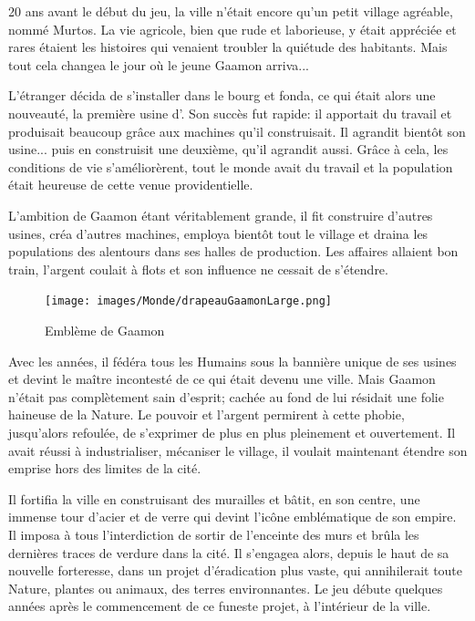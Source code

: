 20 ans avant le début du jeu, la ville n'était encore qu'un petit village agréable, nommé Murtos. La vie agricole, bien que rude et laborieuse, y était appréciée et rares étaient les histoires qui venaient troubler la quiétude des habitants. Mais tout cela changea le jour où le jeune Gaamon arriva...

L'étranger décida de s'installer dans le bourg et fonda, ce qui était alors une nouveauté, la première usine d'\nomUnivers. Son succès fut rapide: il apportait du travail et produisait beaucoup grâce aux machines qu'il construisait. Il agrandit bientôt son usine... puis en construisit une deuxième, qu'il agrandit aussi. Grâce à cela, les conditions de vie s'améliorèrent, tout le monde avait du travail et la population était heureuse de cette venue providentielle.

L'ambition de Gaamon étant véritablement grande, il fit construire d'autres usines, créa d'autres machines, employa bientôt tout le village et draina les populations des alentours dans ses halles de production. Les affaires allaient bon train, l'argent coulait à flots et son influence ne cessait de s'étendre.

\begin{figure}
	\vspace*{-.8cm}
	\center
	\texttt{[image: images/Monde/drapeauGaamonLarge.png]}
	\caption{Emblème de Gaamon}
\end{figure}

Avec les années, il fédéra tous les Humains sous la bannière unique de ses usines et devint le maître incontesté de ce qui était devenu une ville. Mais Gaamon n'était pas complètement sain d'esprit; cachée au fond de lui résidait une folie haineuse de la Nature. Le pouvoir et l'argent permirent à cette phobie, jusqu'alors refoulée, de s'exprimer de plus en plus pleinement et ouvertement. Il avait réussi à industrialiser, mécaniser le village, il voulait maintenant étendre son emprise hors des limites de la cité.

Il fortifia la ville en construisant des murailles et bâtit, en son centre, une immense tour d'acier et de verre qui devint l'icône emblématique de son empire. Il imposa à tous l'interdiction de sortir de l'enceinte des murs et brûla les dernières traces de verdure dans la cité. Il s'engagea alors, depuis le haut de sa nouvelle forteresse, dans un projet d'éradication plus vaste, qui annihilerait toute Nature, plantes ou animaux, des terres environnantes. Le jeu débute quelques années après le commencement de ce funeste projet, à l'intérieur de la ville.

